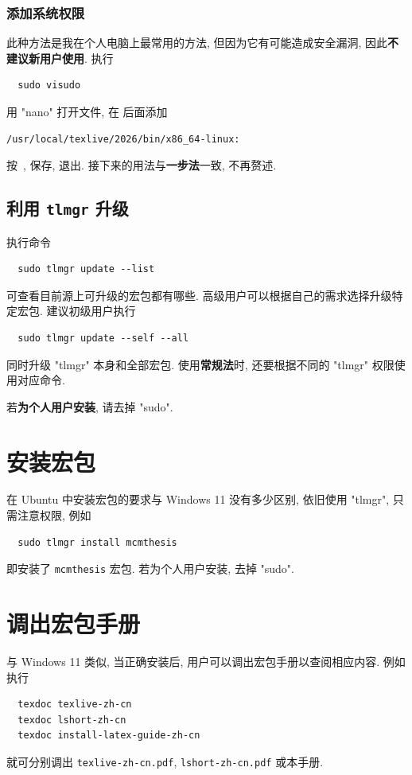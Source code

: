 \subsubsection{添加系统权限}

此种方法是我在个人电脑上最常用的方法,
但因为它有可能造成安全漏洞,
因此\textbf{不建议新用户使用}.
执行
\begin{lstlisting}
  sudo visudo
\end{lstlisting}
用 "nano" 打开文件,
在  后面添加
\begin{lstlisting}[language = {}]
  /usr/local/texlive/2026/bin/x86_64-linux:
\end{lstlisting}
按\ ,  保存,
 退出.
接下来的用法与\textbf{一步法}一致,
不再赘述.

\subsection{利用 \texttt{tlmgr} 升级}

执行命令
\begin{lstlisting}
  sudo tlmgr update --list
\end{lstlisting}
可查看目前源上可升级的宏包都有哪些.
高级用户可以根据自己的需求选择升级特定宏包.
建议初级用户执行
\begin{lstlisting}
  sudo tlmgr update --self --all
\end{lstlisting}
同时升级 "tlmgr" 本身和全部宏包.
使用\textbf{常规法}时,
还要根据不同的 "tlmgr" 权限使用对应命令.

若\textbf{为个人用户安装},
请去掉 "sudo".

\section{安装宏包}\label{sec:ubuntu:installpackage}

在 Ubuntu 中安装宏包的要求与 Windows 11 没有多少区别,
依旧使用 "tlmgr",
只需注意权限,
例如
\begin{lstlisting}
  sudo tlmgr install mcmthesis
\end{lstlisting}
即安装了 \texttt{mcmthesis} 宏包.
若为个人用户安装,
去掉 "sudo".

\section{调出宏包手册}\label{sec:ubuntu:texdoc}

与 Windows 11 类似,
当正确安装后,
用户可以调出宏包手册以查阅相应内容.
例如执行
\begin{lstlisting}
  texdoc texlive-zh-cn
  texdoc lshort-zh-cn
  texdoc install-latex-guide-zh-cn
\end{lstlisting}
就可分别调出 \texttt{texlive-zh-cn.pdf},
\texttt{lshort-zh-cn.pdf}
或本手册.

